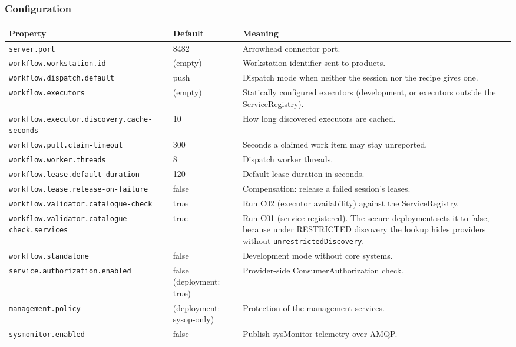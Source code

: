 \documentclass[a4paper]{arrowhead}
\begin{document}
\subsubsection{Configuration}

{\small
\begin{longtable}{|p{5.6cm}|p{3.4cm}|p{6.8cm}|}

\hline
\rowcolor{gray!33} Property & Default & Meaning \\ \hline
\endhead
\texttt{server.\allowbreak{}port} & 8482 & Arrowhead connector port. \\ \hline
\texttt{workflow.\allowbreak{}workstation.\allowbreak{}id} & (empty) & Workstation identifier sent to products. \\ \hline
\texttt{workflow.\allowbreak{}dispatch.\allowbreak{}default} & push & Dispatch mode when neither the session nor the recipe gives one. \\ \hline
\texttt{workflow.\allowbreak{}executors} & (empty) & Statically configured executors (development, or executors outside the ServiceRegistry). \\ \hline
\texttt{workflow.\allowbreak{}executor.\allowbreak{}discovery.\allowbreak{}cache-\allowbreak{}seconds} & 10 & How long discovered executors are cached. \\ \hline
\texttt{workflow.\allowbreak{}pull.\allowbreak{}claim-\allowbreak{}timeout} & 300 & Seconds a claimed work item may stay unreported. \\ \hline
\texttt{workflow.\allowbreak{}worker.\allowbreak{}threads} & 8 & Dispatch worker threads. \\ \hline
\texttt{workflow.\allowbreak{}lease.\allowbreak{}default-\allowbreak{}duration} & 120 & Default lease duration in seconds. \\ \hline
\texttt{workflow.\allowbreak{}lease.\allowbreak{}release-\allowbreak{}on-\allowbreak{}failure} & false & Compensation: release a failed session's leases. \\ \hline
\texttt{workflow.\allowbreak{}validator.\allowbreak{}catalogue-\allowbreak{}check} & true & Run C02 (executor availability) against the ServiceRegistry. \\ \hline
\texttt{workflow.\allowbreak{}validator.\allowbreak{}catalogue-\allowbreak{}check.\allowbreak{}services} & true & Run C01 (service registered). The secure deployment sets it to false, because under RESTRICTED discovery the lookup hides providers without \texttt{unrestrictedDiscovery}. \\ \hline
\texttt{workflow.\allowbreak{}standalone} & false & Development mode without core systems. \\ \hline
\texttt{service.\allowbreak{}authorization.\allowbreak{}enabled} & false (deployment: true) & Provider-side ConsumerAuthorization check. \\ \hline
\texttt{management.\allowbreak{}policy} & (deployment: sysop-only) & Protection of the management services. \\ \hline
\texttt{sysmonitor.\allowbreak{}enabled} & false & Publish sysMonitor telemetry over AMQP. \\ \hline
\end{longtable}
}
\end{document}
